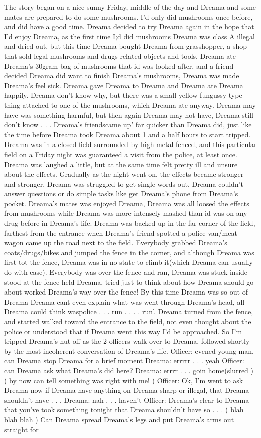 \documentclass[12pt]{book}
\begin{document}
The story began on a nice sunny Friday, middle of the day and Dreama and some mates are prepared to do some mushrooms. I'd only did mushrooms once before, and did have a good time. Dreama decided to try Dreama again in the hope that I'd enjoy Dreama, as the first time I;d did mushrooms Dreama was class A illegal and dried out, but this time Dreama bought Dreama from grasshopper, a shop that sold legal mushrooms and drugs related objects and tools. Dreama ate Dreama's 30gram bag of mushrooms that id was looked after, and a friend decided Dreama did want to finish Dreama's mushrooms, Dreama was made Dreama's feel sick. Dreama gave Dreama to Dreama and Dreama ate Dreama happily. Dreama don't know why, but there was a small yellow fungussy-type thing attached to one of the mushrooms, which Dreama ate anyway. Dreama may have was something harmful, but then again Dreama may not have, Dreama still don't know . . .  Dreama's friendscame up' far quicker than Dreama did, just like the time before Dreama took Dreama about 1 and a half hours to start tripped. Dreama was in a closed field surrounded by high metal fenced, and this particular field on a Friday night was guaranteed a visit from the police, at least once. Dreama was laughed a little, but at the same time felt pretty ill and unsure about the effects. Gradually as the night went on, the effects became stronger and stronger, Dreama was struggled to get single words out, Dreama couldn't answer questions or do simple tasks like get Dreama's phone from Dreama's pocket. Dreama's mates was enjoyed Dreama, Dreama was all loosed the effects from mushrooms while Dreama was more intensely mashed than id was on any drug before in Dreama's life. Dreama was backed up in the far corner of the field, farthest from the entrance when Dreama's friend spotted a police van/meat wagon came up the road next to the field. Everybody grabbed Dreama's coats/drugs/bikes and jumped the fence in the corner, and although Dreama was first tot the fence, Dreama was in no state to climb it(which Dreama can usually do with ease). Everybody was over the fence and ran, Dreama was stuck inside stood at the fence held Dreama, tried just to think about how Dreama should go about worked Dreama's way over the fence! By this time Dreama was so out of Dreama Dreama cant even explain what was went through Dreama's head, all Dreama could think waspolice . . .  run . . .  . run'. Dreama turned from the fence, and started walked toward the entrance to the field, not even thought about the police or understood that if Dreama went this way I'd be approached. So I'm tripped Dreama's nut off as the 2 officers walk over to Dreama, followed shortly by the most incoherent conversation of Dreama's life. Officer: evened young man, can Dreama stop Dreama for a brief moment Dreama: errrrr . . .  yeah Officer: can Dreama ask what Dreama's did here? Dreama: errrr . . .  goin home(slurred ) ( by now can tell something was right with me! ) Officer: Ok, I'm went to ask Dreama now if Dreama have anything on Dreama sharp or illegal, that Dreama shouldn't have . . .  Dreama: nah . . .  haven't Officer: Dreama's clear to Dreama that you've took something tonight that Dreama shouldn't have so . . .  ( blah blah blah ) Can Dreama spread Dreama's legs and put Dreama's arms out straight for 
\end{document}
